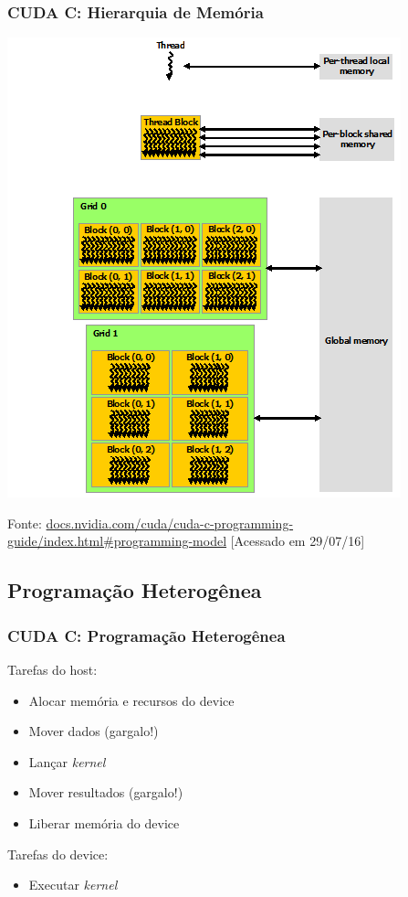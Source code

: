 \documentclass[10pt, compress]{beamer}
\begin{document}
\begin{frame}
    \frametitle{CUDA C: Hierarquia de Memória}
    \begin{center}
        \includegraphics[width=.5\textwidth]{cuda-memory-hierarchy}
    \end{center}

    \vfill

    \begin{center}
        \tiny{Fonte: \url{docs.nvidia.com/cuda/cuda-c-programming-guide/index.html\#programming-model} [Acessado em 29/07/16]}
    \end{center}
\end{frame}

\subsection{Programação Heterogênea}

\begin{frame}
    \frametitle{CUDA C: Programação Heterogênea}
    Tarefas do \alert{host}:
    \begin{itemize}
        \item Alocar memória e recursos do \alert{device}
        \item Mover \alert{dados} (\alert{gargalo!})
            \pause
        \item Lançar \textit{kernel}
            \pause
        \item Mover \alert{resultados} (\alert{gargalo!})
        \item Liberar memória do \alert{device}
    \end{itemize}
    \pause
    Tarefas do \alert{device}:
    \begin{itemize}
        \item Executar \textit{kernel}
    \end{itemize}
\end{frame}
\end{document}
